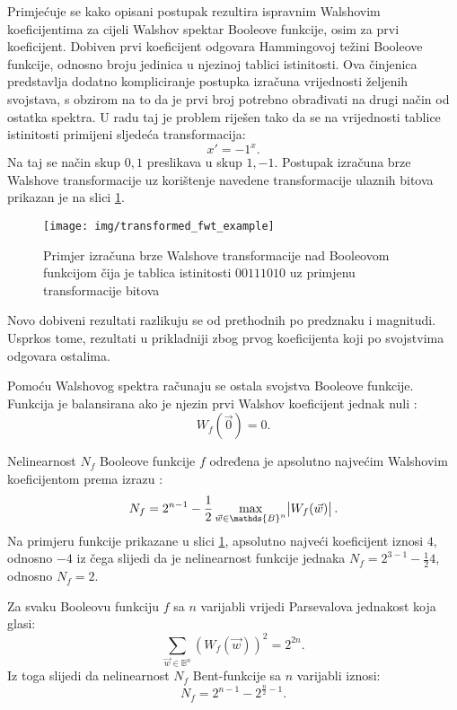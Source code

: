 Primjećuje se kako opisani postupak rezultira ispravnim Walshovim koeficijentima za cijeli Walshov spektar Booleove funkcije, osim za prvi koeficijent.
Dobiven prvi koeficijent odgovara Hammingovoj težini Booleove funkcije, odnosno broju jedinica u njezinoj tablici istinitosti.
Ova činjenica predstavlja dodatno kompliciranje postupka izračuna vrijednosti željenih svojstava, s obzirom na to da je prvi broj potrebno obrađivati na drugi način od ostatka spektra.
U radu \cite{MeasuringBoolean} taj je problem riješen tako da se na vrijednosti tablice istinitosti primijeni sljedeća transformacija:
\begin{equation}
    x' = -1^x.
\end{equation}
Na taj se način skup ${0, 1}$ preslikava u skup ${1, -1}$.
Postupak izračuna brze Walshove transformacije uz korištenje navedene transformacije ulaznih bitova prikazan je na slici \ref{fig:transformed_fwt_example}.
\begin{figure}[ht!] 
    \centering
    \texttt{[image: img/transformed\_fwt\_example]}
    \captionsetup{justification=centering}
    \caption{Primjer izračuna brze Walshove transformacije nad Booleovom funkcijom čija je tablica istinitosti $00111010$ uz primjenu transformacije bitova}
    \label{fig:transformed_fwt_example}
\end{figure}
Novo dobiveni rezultati razlikuju se od prethodnih po predznaku i magnitudi.
Usprkos tome, rezultati u prikladniji zbog prvog koeficijenta koji po svojstvima odgovara ostalima.

Pomoću Walshovog spektra računaju se ostala svojstva Booleove funkcije.
Funkcija je balansirana ako je njezin prvi Walshov koeficijent jednak nuli \cite{MaximalNonlinearity}:
\begin{equation}
    W_f(\vec{0}) = 0.
\end{equation} 

Nelinearnost $N_f$ Booleove funkcije $f$ određena je apsolutno najvećim Walshovim koeficijentom prema izrazu \cite{MaximalNonlinearity}:
\begin{equation}
    N_f = 2^{n-1} - \frac{1}{2}\max_{\vec{w} \in \mathds{B}^n} \abs{W_f(\vec{w})}.
\end{equation}
Na primjeru funkcije prikazane u slici \ref{fig:transformed_fwt_example}, apsolutno najveći koeficijent iznosi $4$, odnosno $-4$ iz čega slijedi da je nelinearnost funkcije jednaka $N_f = 2^{3-1} - \frac{1}{2}4$, odnosno $N_f = 2$.

Za svaku Booleovu funkciju $f$ sa $n$ varijabli vrijedi Parsevalova jednakost koja glasi:
\begin{equation}
    \sum_{\vec{w}\in \mathds{B}^n} \left( W_f(\vec{w}) \right)^2 = 2^{2n}.
\end{equation} 
Iz toga slijedi da nelinearnost $N_f$ Bent-funkcije sa $n$ varijabli iznosi:
\begin{equation}
    N_f = 2^{n-1} - 2^{\frac{n}{2}-1}.
\end{equation}